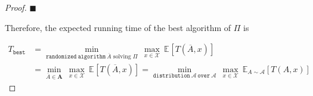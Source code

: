 \documentclass{article}
\renewcommand{\qedsymbol}{\hfill $\blacksquare$\par}
\newcommand{\staExp}[2]{\mathbb{E}_{#1}\left[#2\right]}
\begin{document}
\begin{proof}
    \vspace{-2em}
    \qedsymbol
    
    \vspace{2em} \hspace{1.3em}
    Therefore, the expected running time of the best algorithm of $\Pi$ is
    
    \vspace{-2.5em}
    \begin{align*}
        T_{\mathtt{best}} &= \underset{\mathtt{randomized\ algorithm\ }\overline{A}\text{ solving }\Pi}{\min}\ \underset{x\in\mathcal{X}}{\max}\  \staExp{}{T(\overline{A},x)} \\
        &= \underset{\overline{A}\in\mathbf{A}}{\min}\ \underset{x\in\mathcal{X}}{\max}\ \staExp{}{T(\overline{A},x)} = \underset{\mathtt{distribution\ }\mathscr{A}\mathtt{\ over\ }\mathcal{A}}{\min}\ \underset{x\in\mathcal{X}}{\max}\ \staExp{A\sim\mathscr{A}}{T(A,x)}
    \end{align*}
    
    \vspace{-3.3em}
\end{proof}

\vspace{2em}
\end{document}
